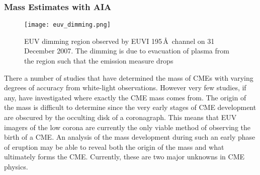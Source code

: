 
\subsubsection{Mass Estimates with AIA}
\begin{figure}[t!]
\begin{center}
\texttt{[image: euv\_dimming.png]}
\caption[EUVI dimming region]{EUV dimming region observed by EUVI 195\,\AA~channel on 31 December 2007. The dimming is due to evacuation of plasma from the region such that the emission measure drops \citep{aschw09}}
\end{center}
\end{figure}
There a number of studies that have determined the mass of CMEs with varying degrees of accuracy from white-light observations. However very few studies, if any, have investigated where exactly the CME mass comes from. The origin of the mass is difficult to determine since the very early stages of CME development are obscured by the occulting disk of a coronagraph. This means that EUV imagers of the low corona are currently the only viable method of observing the birth of a CME. An analysis of the mass development during such an early phase of eruption may be able to reveal both the origin of the mass and what ultimately forms the CME. Currently, these are two major unknowns in CME physics.

